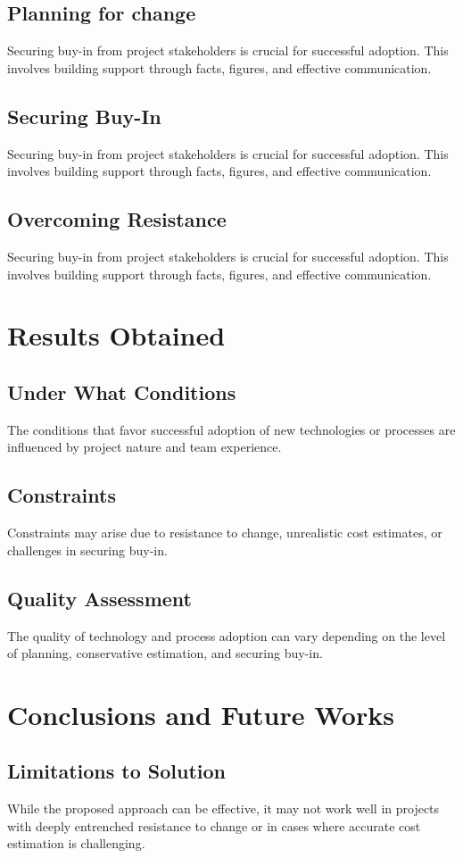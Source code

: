 \documentclass{article}
\begin{document}
\subsection{Planning for change}
Securing buy-in from project stakeholders is crucial for successful adoption. This involves building support through facts, figures, and effective communication.
\subsection{Securing Buy-In}
Securing buy-in from project stakeholders is crucial for successful adoption. This involves building support through facts, figures, and effective communication.
\subsection{Overcoming Resistance}
Securing buy-in from project stakeholders is crucial for successful adoption. This involves building support through facts, figures, and effective communication.



\section{Results Obtained}
\subsection{Under What Conditions}
The conditions that favor successful adoption of new technologies or processes are influenced by project nature and team experience.
\subsection{Constraints}
Constraints may arise due to resistance to change, unrealistic cost estimates, or challenges in securing buy-in.
\subsection{Quality Assessment}
The quality of technology and process adoption can vary depending on the level of planning, conservative estimation, and securing buy-in.

\section{Conclusions and Future Works}
\subsection{Limitations to Solution}
While the proposed approach can be effective, it may not work well in projects with deeply entrenched resistance to change or in cases where accurate cost estimation is challenging.
\end{document}
